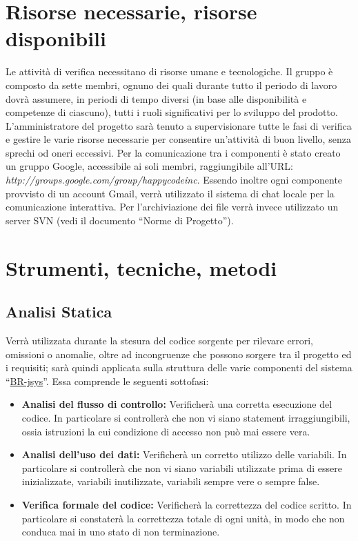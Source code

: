 \section{Risorse necessarie, risorse disponibili}
Le attivit\`a di verifica necessitano di risorse umane e tecnologiche. Il gruppo \`e composto da sette membri, ognuno dei quali durante tutto il periodo di lavoro dovr\`a assumere, in periodi di tempo diversi (in base alle disponibilit\`a e competenze di ciascuno), tutti i ruoli significativi per lo sviluppo del prodotto. L'amministratore del progetto sar\`a tenuto a supervisionare tutte le fasi di verifica e gestire le varie risorse necessarie per consentire un'attivit\`a di buon livello, senza sprechi od oneri eccessivi. Per la comunicazione tra i componenti \`e stato creato un gruppo Google, accessibile ai soli membri, raggiungibile all'URL: \textit{http://groups.google.com/group/happycodeinc}. Essendo inoltre ogni componente provvisto di un account Gmail, verr\`a utilizzato il sistema di chat locale per la comunicazione interattiva. Per l'archiviazione dei file verr\`a invece utilizzato un server SVN (vedi il documento ``Norme di Progetto'').

\section{Strumenti, tecniche, metodi}
\subsection{Analisi Statica}
Verr\`a utilizzata durante la stesura del codice sorgente per rilevare errori, omissioni o anomalie, oltre ad incongruenze che possono sorgere tra il progetto ed i requisiti; sar\`a quindi applicata sulla struttura delle varie componenti del sistema ``\underline{BR-jsys}''. Essa comprende le seguenti sottofasi:
\begin{itemize}
\item \textbf{Analisi del flusso di controllo:} Verificher\`a una corretta esecuzione del codice.
In particolare si controller\`a che non vi siano statement irraggiungibili, ossia istruzioni la cui condizione di accesso non pu\`o mai essere vera.
\item \textbf{Analisi dell'uso dei dati:} Verificher\`a un corretto utilizzo delle variabili.
In particolare si controller\`a che non vi siano variabili utilizzate prima di essere inizializzate, variabili inutilizzate, variabili sempre vere o sempre false.
\item \textbf{Verifica formale del codice:} Verificher\`a la correttezza del codice scritto. In particolare si constater\`a la correttezza totale di ogni unit\`a, in modo che non conduca mai in uno stato di non terminazione.
\end{itemize}

